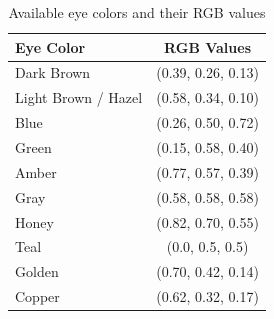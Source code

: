 \documentclass{article}
\begin{document}
\begin{table}[h]
    \centering
    \begin{tabular}{|l|c|}
    \hline
    \textbf{Eye Color} & \textbf{RGB Values} \\
    \hline
    Dark Brown & (0.39, 0.26, 0.13) \\
    \hline
    Light Brown / Hazel & (0.58, 0.34, 0.10) \\
    \hline
    Blue & (0.26, 0.50, 0.72) \\
    \hline
    Green & (0.15, 0.58, 0.40) \\
    \hline
    Amber & (0.77, 0.57, 0.39) \\
    \hline
    Gray & (0.58, 0.58, 0.58) \\
    \hline
    Honey & (0.82, 0.70, 0.55) \\
    \hline
    Teal & (0.0, 0.5, 0.5) \\
    \hline
    Golden & (0.70, 0.42, 0.14) \\
    \hline
    Copper & (0.62, 0.32, 0.17) \\
    \hline
    \end{tabular}
    \caption{Available eye colors and their RGB values}
    \label{table:eye_colors}
\end{table}



\end{document}

